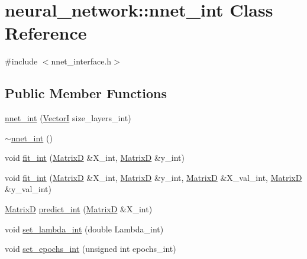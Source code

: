 \hypertarget{classneural__network_1_1nnet__int}{}\section{neural\+\_\+network\+:\+:nnet\+\_\+int Class Reference}
\label{classneural__network_1_1nnet__int}


{\ttfamily \#include $<$nnet\+\_\+interface.\+h$>$}

\subsection*{Public Member Functions}
\begin{DoxyCompactItemize}
\item 
\hyperlink{classneural__network_1_1nnet__int_ac08ffc21bf083695f5aeb8a5f13b1994}{nnet\+\_\+int} (\hyperlink{nnet__interface_8h_a700afecc4fd2c8e786e3c57653532623}{Vector\+I} size\+\_\+layers\+\_\+int)
\item 
\hyperlink{classneural__network_1_1nnet__int_aca20d1408fde1cf1a7d3d2d11800cfd1}{$\sim$nnet\+\_\+int} ()
\item 
void \hyperlink{classneural__network_1_1nnet__int_a1c93f5cf8218ff6013cdba3cdeb405d4}{fit\+\_\+int} (\hyperlink{nnet__interface_8h_a97d821bf195874d0aa871fa46e2c1168}{Matrix\+D} \&X\+\_\+int, \hyperlink{nnet__interface_8h_a97d821bf195874d0aa871fa46e2c1168}{Matrix\+D} \&y\+\_\+int)
\item 
void \hyperlink{classneural__network_1_1nnet__int_a97a1bdbc7605a44cf4973854c1a3f589}{fit\+\_\+int} (\hyperlink{nnet__interface_8h_a97d821bf195874d0aa871fa46e2c1168}{Matrix\+D} \&X\+\_\+int, \hyperlink{nnet__interface_8h_a97d821bf195874d0aa871fa46e2c1168}{Matrix\+D} \&y\+\_\+int, \hyperlink{nnet__interface_8h_a97d821bf195874d0aa871fa46e2c1168}{Matrix\+D} \&X\+\_\+val\+\_\+int, \hyperlink{nnet__interface_8h_a97d821bf195874d0aa871fa46e2c1168}{Matrix\+D} \&y\+\_\+val\+\_\+int)
\item 
\hyperlink{nnet__interface_8h_a97d821bf195874d0aa871fa46e2c1168}{Matrix\+D} \hyperlink{classneural__network_1_1nnet__int_af829eb8e872fb73b9c18d324a63145ae}{predict\+\_\+int} (\hyperlink{nnet__interface_8h_a97d821bf195874d0aa871fa46e2c1168}{Matrix\+D} \&X\+\_\+int)
\item 
void \hyperlink{classneural__network_1_1nnet__int_aff12842c7a3c6e790df5cc7c4bf845d4}{set\+\_\+lambda\+\_\+int} (double Lambda\+\_\+int)
\item 
void \hyperlink{classneural__network_1_1nnet__int_a7ecfec38eb7c6b48b9eec3d8c24f9a07}{set\+\_\+epochs\+\_\+int} (unsigned int epochs\+\_\+int)

\end{DoxyCompactItemize}
